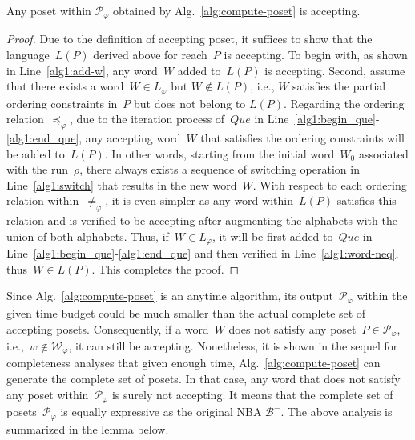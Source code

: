 \begin{lemma}\label{lemma:accepting-poset}
Any poset within $\mathcal{P}_{\varphi}$ obtained by Alg.~\ref{alg:compute-poset}
is accepting.
\end{lemma}
\begin{proof}
Due to the definition of accepting poset, it suffices to show that the
language~$L(P)$ derived above for reach~$P$ is accepting.
To begin with, as shown in Line~\ref{alg1:add-w}, any word~$W$ added to~$L(P)$
is accepting.
Second, assume that there exists a word~$W\in L_\varphi$ but $W\notin L(P)$, i.e.,
$W$ satisfies the partial ordering constraints in~$P$ but does not belong to $L(P)$.
Regarding the ordering relation~$\preceq_{\varphi}$,
due to the iteration process of~$Que$ in Line~\ref{alg1:begin_que}-\ref{alg1:end_que},
any accepting word~$W$ that satisfies the ordering constraints will be added
to~$L(P)$.
In other words, starting from the initial word~$W_0$ associated with the run~$\rho$,
there always exists a sequence of switching operation in Line~\ref{alg1:switch} that results
in the new word~$W$.
With respect to each ordering relation within~$\neq_{\varphi}$, it is even simpler
as any word within~$L(P)$ satisfies this relation and is verified to be accepting
after augmenting the alphabets with the union of both alphabets.
Thus, if~$W\in L_{\varphi}$, it will be first added to~$Que$ in
Line~\ref{alg1:begin_que}-\ref{alg1:end_que} and then
verified in Line~\ref{alg1:word-neq}, thus~$W\in L(P)$. This completes the proof.
\end{proof}



Since Alg.~\ref{alg:compute-poset} is an anytime algorithm,
its output~$\mathcal{P}_{\varphi}$ within the given time budget
could be much smaller than the actual complete set of accepting posets.
Consequently, if a word~$W$ does not satisfy
any poset~$P\in \mathcal{P}_{\varphi}$, i.e.,~$w\notin \mathcal{W}_{\varphi}$,
it can still be accepting.
Nonetheless, it is shown in the sequel for completeness analyses that
given enough time, Alg.~\ref{alg:compute-poset} can generate
the complete set of posets.
In that case, any word that does not satisfy any poset
within~$\mathcal{P}_{\varphi}$ is surely not accepting.
It means that the complete set of posets~$\mathcal{P}_{\varphi}$ is
equally expressive as the original NBA $\mathcal{B}^-$.
The above analysis is summarized in the lemma below.

